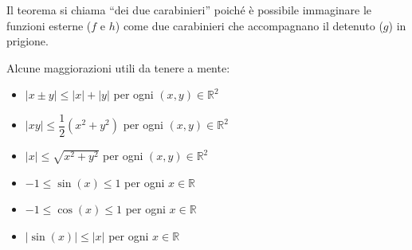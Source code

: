 \documentclass[a4paper]{article}
\newcommand{\dquotes}[1]{``#1''}
\begin{document}
	\noindent
	Il teorema si chiama \dquotes{dei due carabinieri} poiché è possibile immaginare le funzioni esterne ($f$ e $h$) come due carabinieri che accompagnano il detenuto ($g$) in prigione.\newline

	\noindent
	Alcune maggiorazioni utili da tenere a mente:
	\begin{itemize}
		\item $\left| x \pm y \right| \le \left| x \right| + \left| y \right|$ per ogni $\left(x,y\right) \in \mathbb{R}^{2}$
		
		\item $\left| xy \right| \le \dfrac{1}{2}\left(x^{2} + y^{2}\right)$ per ogni $\left(x,y\right) \in \mathbb{R}^{2}$

		\item $\left| x \right| \le \sqrt{x^{2} + y^{2}}$ per ogni $\left(x,y\right) \in \mathbb{R}^{2}$

		\item $-1 \le \sin\left(x\right) \le 1$ per ogni $x \in \mathbb{R}$

		\item $-1 \le \cos\left(x\right) \le 1$ per ogni $x \in \mathbb{R}$

		\item $\left| \sin\left(x\right) \right| \le \left| x \right|$ per ogni $x \in \mathbb{R}$
	\end{itemize}\newpage
\end{document}
